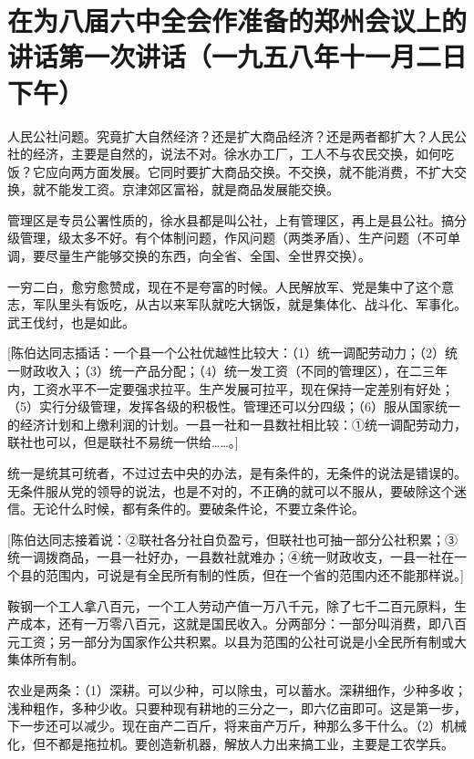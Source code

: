 \section[在为八届六中全会作准备的郑州会议上的讲话第一次讲话（一九五八年十一月二日下午）]{在为八届六中全会作准备的郑州会议上的讲话第一次讲话（一九五八年十一月二日下午）}


人民公社问题。究竟扩大自然经济？还是扩大商品经济？还是两者都扩大？人民公社的经济，主要是自然的，说法不对。徐水办工厂，工人不与农民交换，如何吃饭？它应向两方面发展。它同时要扩大商品交换。不交换，就不能消费，不扩大交换，就不能发工资。京津郊区富裕，就是商品发展能交换。

管理区是专员公署性质的，徐水县都是叫公社，上有管理区，再上是县公社。搞分级管理，级太多不好。有个体制问题，作风问题（两类矛盾）、生产问题（不可单调，要尽量生产能够交换的东西，向全省、全国、全世界交换）。

一穷二白，愈穷愈赞成，现在不是夸富的时候。人民解放军、党是集中了这个意志，军队里头有饭吃，从古以来军队就吃大锅饭，就是集体化、战斗化、军事化。武王伐纣，也是如此。

[陈伯达同志插话：一个县一个公社优越性比较大：（1）统一调配劳动力；（2）统一财政收入；（3）统一产品分配；（4）统一发工资（不同的管理区），在二三年内，工资水平不一定要强求拉平。生产发展可拉平，现在保持一定差别有好处；（5）实行分级管理，发挥各级的积极性。管理还可以分四级；（6）服从国家统一的经济计划和上缴利润的计划。一县一社和一县数社相比较：①统一调配劳动力，联社也可以，但是联社不易统一供给……。]

统一是统其可统者，不过过去中央的办法，是有条件的，无条件的说法是错误的。无条件服从党的领导的说法，也是不对的，不正确的就可以不服从，要破除这个迷信。无论什么时候，都有条件的。要破条件论，不要立条件论。

[陈伯达同志接着说：②联社各分社自负盈亏，但联社也可抽一部分公社积累；③统一调拨商品，一县一社好办，一县数社就难办；④统一财政收支，一县一社在一个县的范围内，可说是有全民所有制的性质，但在一个省的范围内还不能那样说。]

鞍钢一个工人拿八百元，一个工人劳动产值一万八千元，除了七千二百元原料，生产成本，还有一万零八百元，这就是国民收入。分两部分：一部分叫消费，即八百元工资；另一部分为国家作公共积累。以县为范围的公社可说是小全民所有制或大集体所有制。

农业是两条：（1）深耕。可以少种，可以除虫，可以蓄水。深耕细作，少种多收；浅种粗作，多种少收。只要种现有耕地的三分之一，即六亿亩即可。这是第一步，下一步还可以减少。现在亩产二百斤，将来亩产万斤，种那么多干什么。（2）机械化，但不都是拖拉机。要创造新机器，解放人力出来搞工业，主要是工农学兵。

